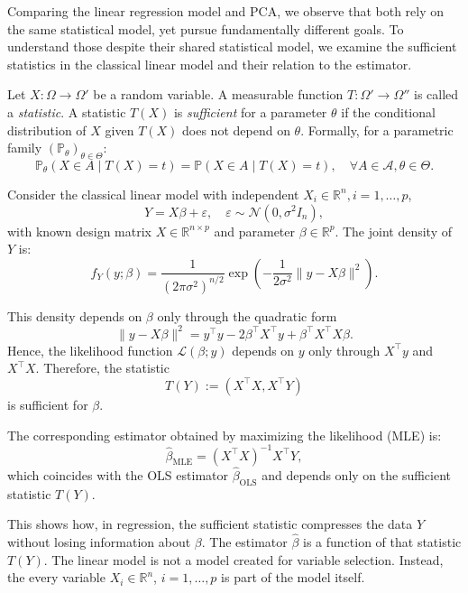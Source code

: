 Comparing the linear regression model and PCA, we observe that both rely on the same statistical model, yet pursue fundamentally different goals. To understand those despite their shared statistical model, we examine the sufficient statistics in the classical linear model and their relation to the estimator.

\begin{defn}
Let $X : \Omega \rightarrow \Omega'$ be a random variable. A measurable function $T: \Omega' \rightarrow \Omega''$ is called a \emph{statistic}. A statistic $T(X)$ is \emph{sufficient} for a parameter $\theta$ if the conditional distribution of $X$ given $T(X)$ does not depend on $\theta$. Formally, for a parametric family $(\mathbb{P}_\theta)_{\theta \in \Theta}$:
\[
\mathbb{P}_\theta(X \in A \mid T(X) = t) = \mathbb{P}(X \in A \mid T(X) = t), \quad \forall A \in \mathcal{A}, \theta \in \Theta.
\]
\end{defn}

\begin{ex}
Consider the classical linear model with independent $X_i \in \mathbb{R}^n, i = 1, \dots, p$,
\[
Y = X \beta + \varepsilon, \quad \varepsilon \sim \mathcal{N}(0, \sigma^2 I_n),
\]
with known design matrix $X \in \mathbb{R}^{n \times p}$ and parameter $\beta \in \mathbb{R}^p$. The joint density of $Y$ is:
\[
f_Y(y; \beta) = \frac{1}{(2\pi \sigma^2)^{n/2}} \exp\left(-\frac{1}{2\sigma^2} \| y - X\beta \|^2 \right).
\]

This density depends on $\beta$ only through the quadratic form
\[
\| y - X\beta \|^2 = y^\top y - 2\beta^\top X^\top y + \beta^\top X^\top X \beta.
\]
Hence, the likelihood function $\mathcal{L}(\beta; y)$ depends on $y$ only through $X^\top y$ and $X^\top X$. Therefore, the statistic
\[
T(Y) := (X^\top X, X^\top Y)
\]
is sufficient for $\beta$.

The corresponding estimator obtained by maximizing the likelihood (MLE) is:
\[
\hat{\beta}_{\text{MLE}} = (X^\top X)^{-1} X^\top Y,
\]
which coincides with the OLS estimator $\hat{\beta}_{\text{OLS}}$ and depends only on the sufficient statistic $T(Y)$.
\end{ex}

This shows how, in regression, the sufficient statistic compresses the data $Y$ without losing information about $\beta$. The estimator $\hat{\beta}$ is a function of that statistic $T(Y)$. The linear model is not a model created for variable selection. Instead, the every variable $X_i \in \mathbb{R}^n$, $i = 1, \dots, p$ is part of the model itself.

